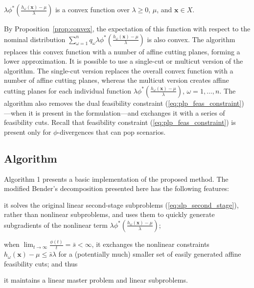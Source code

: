 \documentclass[opre,nonblindrev]{informs3} %
\newcommand{\x}{\mathbf{x}}
\begin{document}
\begin{proposition}\label{prop:convex}
$\lambda \phi^*\left(\frac{h_\omega(\x) - \mu}{\lambda}\right)$ is a convex function over $\lambda \geq 0$, $\mu$, and $\x \in X$. 
\end{proposition} 


By Proposition~\ref{prop:convex}, the expectation of this function with respect to the nominal distribution $\sum_{\omega=1}^{n} q_\omega \lambda \phi^*\left(\frac{h_\omega(\x) - \mu}{\lambda}\right)$ is also convex.
The algorithm replaces this convex function with a number of affine cutting planes, forming a lower approximation. 
It is possible to use a single-cut or multicut version of the algorithm. 
The single-cut version replaces the overall convex function with a number of affine cutting planes, whereas the multicut version creates affine cutting planes for each individual function $\lambda \phi^*\left(\frac{h_\omega(\x) - \mu}{\lambda}\right)$, $\omega = 1,\ldots,n$. 
The algorithm also removes the dual feasibility constraint (\ref{eq:plp_feas_constraint})---when it is present in the formulation---and exchanges it with a series of feasibility cuts.
Recall that feasibility constraint (\ref{eq:plp_feas_constraint}) is present only for $\phi$-divergences that can pop scenarios. 
  


\subsection{Algorithm}
\label{ssec:algo}

Algorithm 1 presents a basic implementation of the proposed method. 
The modified Bender's decomposition presented here has the following features:
\begin{inparaenum}
	\item it solves the original linear second-stage subproblems (\ref{eq:slp_second_stage}), rather than nonlinear subproblems, and uses them to quickly generate subgradients of the nonlinear term $\lambda \phi^*\left(\tfrac{h_\omega(\x) - \mu}{\lambda}\right)$; 
	\item when $\lim_{t \rightarrow \infty}\frac{\phi(t)}{t}=\bar{s}<\infty$, it exchanges the nonlinear constraints $h_\omega(\x) - \mu \leq \bar{s} \lambda$ for a (potentially much) smaller set of easily generated affine feasibility cuts; and thus
	\item  it maintains a linear master problem and linear subproblems.
\end{inparaenum}
\end{document}
